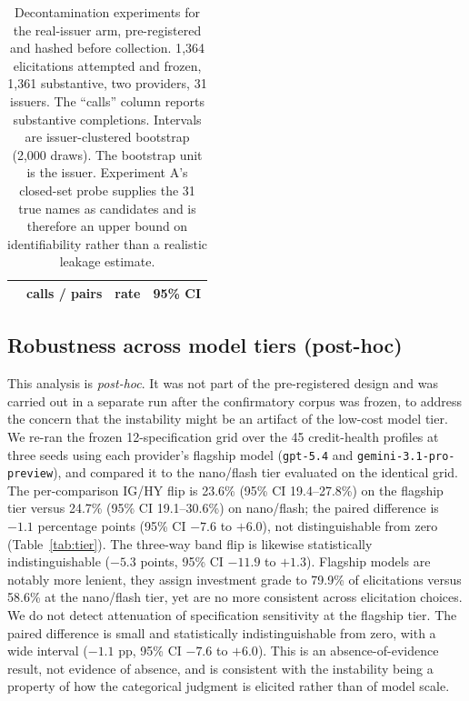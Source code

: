 \documentclass[a4paper,fleqn]{cas-sc}
\begin{document}
\begin{table}[t]\centering
\caption{Decontamination experiments for the real-issuer arm, pre-registered and hashed before
collection. 1{,}364 elicitations attempted and frozen, 1{,}361 substantive, two providers,
31 issuers. The ``calls'' column reports substantive completions. Intervals are issuer-clustered
bootstrap (2{,}000 draws). The bootstrap unit is the issuer. Experiment A's closed-set probe
supplies the 31 true names as candidates and is therefore an upper bound on identifiability rather
than a realistic leakage estimate.}
\label{tab:decontam}
\begin{tabular}{lccc}\toprule
 & calls / pairs & rate & 95\% CI \\\midrule%

\end{tabular}\end{table}

\subsection{Robustness across model tiers (post-hoc)}\label{sec:tier}
This analysis is \emph{post-hoc}. It was not part of the pre-registered design and was carried out in a
separate run after the confirmatory corpus was frozen, to address the
concern that the instability might be an artifact of the low-cost model tier. We re-ran the frozen
12-specification grid over the 45 credit-health profiles at three seeds using each provider's flagship
model (\texttt{gpt-5.4} and \texttt{gemini-3.1-pro-preview}), and compared it to the nano/flash tier
evaluated on the identical grid. The per-comparison IG/HY flip is 23.6\%
(95\% CI 19.4--27.8\%) on the flagship tier versus 24.7\% (95\% CI 19.1--30.6\%) on nano/flash; the
paired difference is $-1.1$ percentage points (95\% CI $-7.6$ to $+6.0$), not distinguishable from zero
(Table~\ref{tab:tier}). The three-way band flip is likewise statistically indistinguishable
($-5.3$ points, 95\% CI $-11.9$ to $+1.3$). Flagship models are notably more lenient, they assign
investment grade to 79.9\% of elicitations versus 58.6\% at the nano/flash tier, yet are no more
consistent across elicitation choices. We do not detect attenuation of specification sensitivity at the flagship tier. The paired difference is small and statistically indistinguishable from zero, with a wide
interval ($-1.1$ pp, 95\% CI $-7.6$ to $+6.0$). This is an absence-of-evidence result, not evidence of
absence, and is consistent with the instability being a property of how the categorical judgment is
elicited rather than of model scale.
\end{document}

